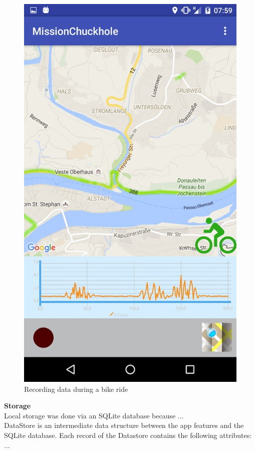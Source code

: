\documentclass[10pt,a4paper]{article} %
\begin{document}
    \begin{figure}[H]
	\centering
    \includegraphics[scale=0.4]{pic2}
    \caption{Recording data during a bike ride }
		  \label{fig:record_data}
    \end{figure}
    \noindent
    \textbf{Storage}\\
    Local storage was done via an SQLite database because ...\\
    DataStore is an intermediate data structure between the app features and the SQLite database. Each record of the Datastore contains the following attributes: ...
    
\end{document}
